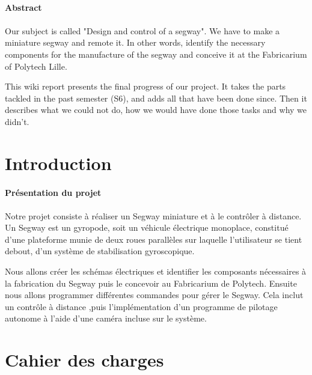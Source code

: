 \documentclass[oneside,a4paper,12pt]{article}
\begin{document}
	\paragraph{Abstract}\paragraph{}
	
	Our subject is called "Design and control of a segway". We have to make a miniature segway and remote it. In other words, identify the necessary components for the manufacture of the segway and conceive it at the Fabricarium of Polytech Lille.
	
	This wiki report presents the final progress of our project. It takes the parts tackled in the past semester (S6), and adds all that have been done since. Then it describes what we could not do, how we would have done those tasks and why we didn’t.
	\vspace{\fill}
	
	\newpage
	\tableofcontents
	
	
	\newpage
	
	\section{Introduction}
	
	\paragraph{Présentation du projet}\paragraph{}
	
	Notre projet consiste à réaliser un Segway miniature et à le contrôler à distance. Un Segway est un gyropode, soit un véhicule électrique monoplace, constitué d’une plateforme munie de deux roues parallèles sur laquelle l’utilisateur se tient debout, d’un système de stabilisation gyroscopique.

	Nous allons créer les schémas électriques et identifier les composants nécessaires à la fabrication du Segway puis le concevoir au Fabricarium de Polytech. Ensuite nous allons programmer différentes commandes pour gérer le Segway. Cela inclut un contrôle à distance ,puis l’implémentation d’un programme de pilotage autonome à l’aide d’une caméra incluse sur le système.

	\newpage
	
	\section{Cahier des charges}
	
\end{document}
